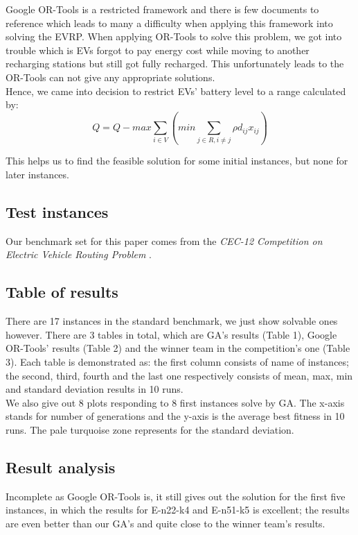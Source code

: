 \documentclass[conference,compsoc]{IEEEtran}
\begin{document}
Google OR-Tools is a restricted framework and there is few documents to reference which leads to many a difficulty when applying this framework into solving the EVRP. When applying OR-Tools to solve this problem, we got into trouble which is EVs forgot to pay energy cost while moving to another recharging stations but still got fully recharged. This unfortunately leads to the OR-Tools can not give any appropriate solutions.\\

Hence, we came into decision to restrict EVs' battery level to a range calculated by:
\begin{equation}
    Q = Q - max{\sum_{i \in V}{\left(min{\sum_{j\in R, i \neq j}{\rho d_{ij}x_{ij}}}\right)}}
\end{equation}

This helps us to find the feasible solution for some initial instances, but none for later instances.
\subsection*{Test instances}
Our benchmark set for this paper comes from the \textit{CEC-12 Competition on Electric Vehicle Routing Problem} \cite{evrp_benchmark}.
\subsection*{Table of results}
There are 17 instances in the standard benchmark, we just show solvable ones however. There are 3 tables in total, which are GA's results (Table 1), Google OR-Tools' results (Table 2) and the winner team in the competition's one (Table 3). Each table is demonstrated as: the first column consists of name of instances; the second, third, fourth and the last one respectively consists of mean, max, min and standard deviation results in 10 runs.\\
We also give out 8 plots responding to 8 first instances solve by GA. The x-axis stands for number of generations and the y-axis is the average best fitness in 10 runs. The pale turquoise zone represents for the standard deviation.

\subsection*{Result analysis}
Incomplete as Google OR-Tools is, it still gives out the solution for the first five instances, in which the results for E-n22-k4 and E-n51-k5 is excellent; the results are even better than our GA's and quite close to the winner team's results.\\
\end{document}

